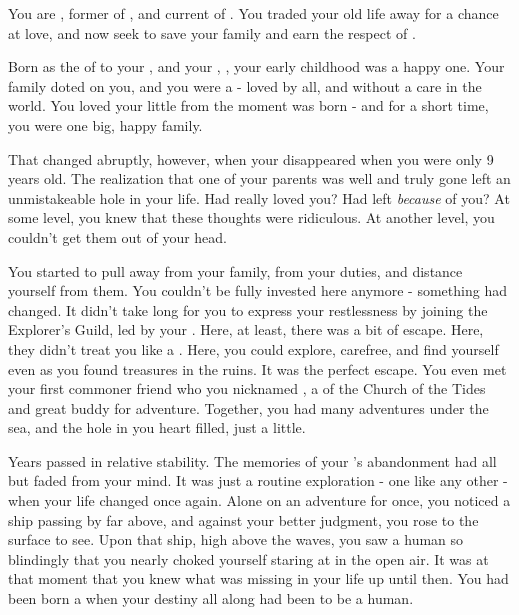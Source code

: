 \documentclass[char]{NeptuneBall}
\begin{document}
\name{\cAriel{}}





You are \cAriel{}, former \cAriel{\Prince} of \pAtlantis{}, and current \cAriel{\King} of \pAmerica{}. You traded your old life away for a chance at love, and now seek to save your family and earn the respect of \pAmerica{}.

Born as the \cAriel{\mer} \cAriel{\prince} of \pAtlantis{} to your \cKing{\parent}, \cKing{\King} \cKing{} and your \cQueen{\parent}, \cQueen{\King} \cQueen{}, your early childhood was a happy one. Your family doted on you, and you were a \cAriel{\prince} - loved by all, and without a care in the world. You loved your little \cPrincess{\sibling} \cPrincess{} from the moment \cPrincess{\they} was born - and for a short time, you were one big, happy family.

That changed abruptly, however, when your \cQueen{\parent} disappeared when you were only 9 years old. The realization that one of your parents was well and truly gone left an unmistakeable hole in your life. Had \cQueen{\they} really loved you? Had \cQueen{\they} left \emph{because} of you? At some level, you knew that these thoughts were ridiculous. At another level, you couldn't get them out of your head.

You started to pull away from your family, from your duties, and distance yourself from them. You couldn't be fully invested here anymore - something had changed. It didn't take long for you to express your restlessness by joining the Explorer's Guild, led by your \cPlant{\Uncle} \cPlant{}. Here, at least, there was a bit of escape. Here, they didn't treat you like a \cAriel{\prince}. Here, you could explore, carefree, and find yourself even as you found treasures in the ruins. It was the perfect escape. You even met your first commoner friend who you nicknamed \cPriest{}, a \cPriest{\priest} of the Church of the Tides and great buddy for adventure. Together, you had many adventures under the sea, and the hole in you heart filled, just a little.

Years passed in relative stability. The memories of your \cQueen{\parent}'s abandonment had all but faded from your mind. It was just a routine exploration - one like any other - when your life changed once again. Alone on an adventure for once, you noticed a ship passing by far above, and against your better judgment, you rose to the surface to see. Upon that ship, high above the waves, you saw a human so blindingly \cEric{\hot} that you nearly choked yourself staring at \cEric{\them} in the open air. It was at that moment that you knew what was missing in your life up until then. You had been born a \cAriel{\mer} when your destiny all along had been to be a human.
\end{document}
